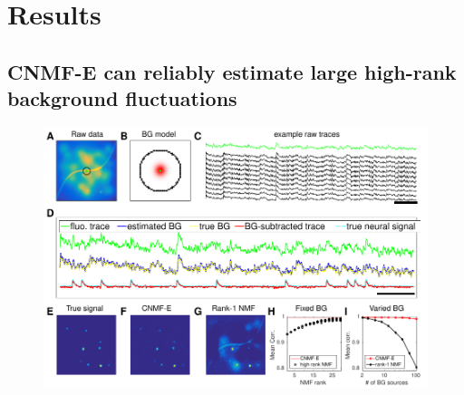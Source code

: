\documentclass[9pt,lineno]{elife}
\begin{document}
\section{Results} \label{sec:results}
\subsection{CNMF-E can reliably estimate large high-rank background fluctuations}

\begin{figure}[!t]
  \includegraphics[width=1\textwidth]{Fig_BG.pdf}

\end{figure}
\end{document}

